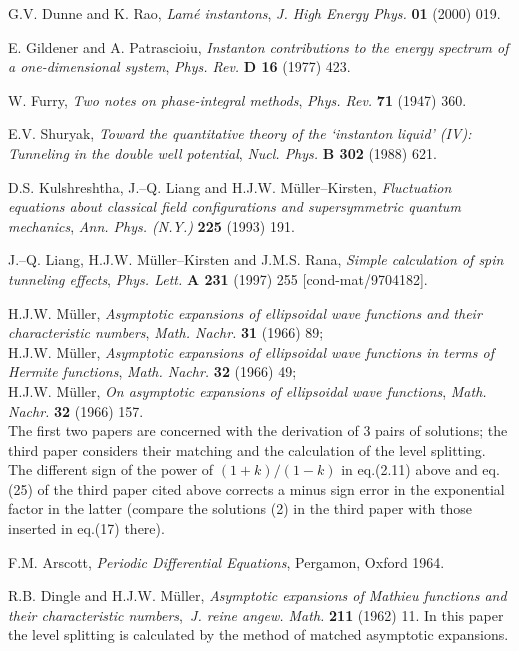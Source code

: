 \documentclass[a4paper,12pt,a4]{article}
\begin{document}
 


\begin{thebibliography}{99}

  G.V. Dunne and K. Rao, {\it Lam\'{e} instantons}, {\it J. High
Energy Phys.} {\bf 01} (2000) 019.

  E. Gildener and A. Patrascioiu, {\it Instanton contributions to
the energy spectrum of a one-dimensional system}, {\it Phys. Rev.} {\bf D 16}
(1977) 423.

  W. Furry, {\it Two notes on phase-integral methods}, {\it Phys.
Rev.} {\bf 71} (1947) 360.

  E.V. Shuryak, {\it Toward the quantitative theory of the
`instanton liquid' (IV): Tunneling in the double well potential}, {\it Nucl.
Phys.} {\bf B 302} (1988) 621.

  D.S. Kulshreshtha, J.--Q. Liang and H.J.W. M\"{u}ller--Kirsten, 
{\it Fluctuation equations about classical field configurations and
supersymmetric quantum mechanics}, {\it Ann. Phys. (N.Y.)} {\bf 225} (1993)
191.

  J.--Q. Liang, H.J.W. M\"{u}ller--Kirsten and J.M.S. Rana, {\it %
Simple calculation of spin tunneling effects}, {\it Phys. Lett.} {\bf A 231}
(1997) 255 [cond-mat/9704182].

  H.J.W. M\"{u}ller, {\it Asymptotic expansions of ellipsoidal
wave functions and their characteristic numbers}, {\it Math. Nachr.} {\bf 31}
(1966) 89; \\H.J.W. M\"{u}ller, {\it Asymptotic expansions of ellipsoidal wave
functions in terms of Hermite functions}, {\it Math. Nachr.}  {\bf 32} (1966)
49; \\H.J.W. M\"{u}ller, {\it On asymptotic expansions of ellipsoidal wave
functions}, {\it Math. Nachr.} {\bf 32} (1966) 157.\\ The first two papers are
concerned with the derivation of 3 pairs of solutions; the third paper
considers their matching and the calculation of the level splitting. The
different sign of the power of $(1+k)/(1-k)$ in eq.(2.11) above and eq.(25)
of the third paper cited above corrects a minus sign error in the
exponential factor in the latter (compare the solutions (2) in the third
paper with those inserted in eq.(17) there).

  F.M. Arscott, {\it Periodic Differential Equations}, Pergamon,
Oxford 1964.

  R.B. Dingle and H.J.W. M\"{u}ller, {\it Asymptotic expansions
of Mathieu functions and their characteristic numbers},{\it \ J. reine
angew. Math.} {\bf 211} (1962) 11. In this paper the level splitting is
calculated by the method of matched asymptotic expansions.


\end{thebibliography}
\end{document}
